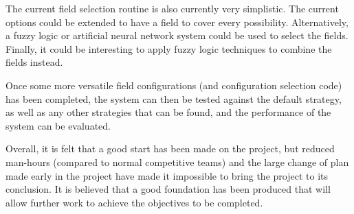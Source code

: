 \documentclass[10pt]{article}
\begin{document}
The current field selection routine is also currently very simplistic.  The
current options could be extended to have a field to cover every possibility. 
Alternatively, a fuzzy logic or artificial neural network system could be used
to select the fields.  Finally, it could be interesting to apply fuzzy logic
techniques to combine the fields instead.

Once some more versatile field configurations (and configuration selection code)
has been completed, the system can then be tested against the default strategy,
as well as any other strategies that can be found, and the performance of the
system can be evaluated.

Overall, it is felt that a good start has been made on the project, but reduced
man-hours (compared to normal competitive teams) and the large change of plan
made early in the project have made it impossible to bring the project to its
conclusion.  It is believed that a good foundation has been produced that will
allow further work to achieve the objectives to be completed.

\cleardoublepage{}
 
\end{document}
